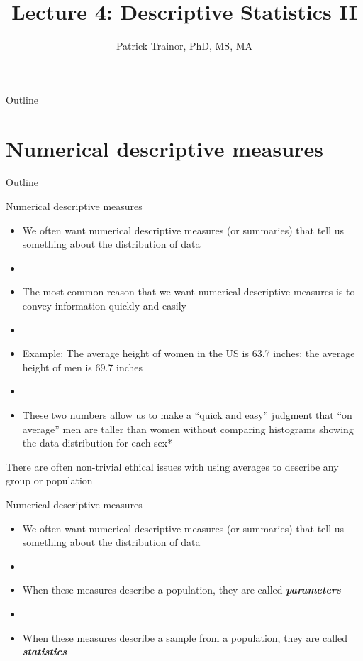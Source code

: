 \documentclass[xcolor=dvipsnames]{beamer}
\title[Lecture 4]{Lecture 4: Descriptive Statistics II}
\author[Patrick Trainor]{Patrick Trainor, PhD, MS, MA}
\institute[NMSU]{New Mexico State University}
\date{}
\begin{document}
	
\begin{frame}
	\maketitle
\end{frame}

\begin{frame}{Outline}
	\tableofcontents[hideallsubsections]
\end{frame}

\section{Numerical descriptive measures}
\begin{frame}{Outline}
	\tableofcontents[currentsection,subsectionstyle=show/shaded/hide]
\end{frame}

\begin{frame}{Numerical descriptive measures}
	\begin{itemize}
		\item We often want numerical descriptive measures (or summaries) that tell us something about the distribution of data \pause
		\item[]
		\item The most common reason that we want numerical descriptive measures is to convey information quickly and easily \pause
		\item[]
		\item Example: The average height of women in the US is 63.7 inches; the average height of men is 69.7 inches \pause
		\item[]
		\item These two numbers allow us to make a ``quick and easy'' judgment that ``on average'' men are taller than women without comparing histograms showing the data distribution for each sex*
	\end{itemize}
{\tiny *There are often non-trivial ethical issues with using averages to describe any group or population}
\end{frame}

\begin{frame}{Numerical descriptive measures}
	\begin{itemize}
		\item We often want numerical descriptive measures (or summaries) that tell us something about the distribution of data
		\item[]
		\item When these measures describe a population, they are called \textbf{\emph{parameters}} \pause
		\item[]
		\item When these measures describe a sample from a population, they are called \textbf{\emph{statistics}}
	\end{itemize}
\end{frame}
\end{document}
